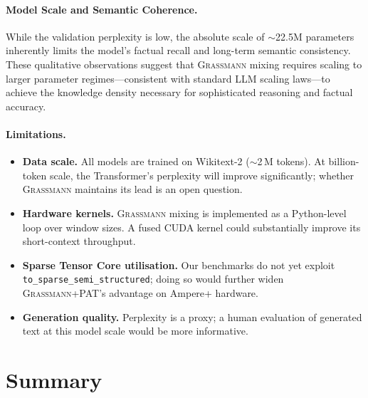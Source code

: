 \documentclass[conference]{IEEEtran}
\newcommand{\grassmann}{\textsc{Grassmann}}
\newcommand{\pat}{\textsc{PAT}}
\begin{document}
\paragraph{Model Scale and Semantic Coherence.}
While the validation perplexity is low, the absolute scale of $\sim$22.5M parameters inherently limits the model's factual recall and long-term semantic consistency. These qualitative observations suggest that \grassmann{} mixing requires scaling to larger parameter regimes—consistent with standard LLM scaling laws—to achieve the knowledge density necessary for sophisticated reasoning and factual accuracy.

\paragraph{Limitations.}
\begin{itemize}[leftmargin=*,topsep=3pt,itemsep=2pt]
  \item \textbf{Data scale.} All models are trained on Wikitext-2
        ($\sim$2\,M tokens). At billion-token scale, the Transformer's
        perplexity will improve significantly; whether \grassmann{}
        maintains its lead is an open question.
  \item \textbf{Hardware kernels.} \grassmann{} mixing is implemented
        as a Python-level loop over window sizes. A fused CUDA kernel
        could substantially improve its short-context throughput.
  \item \textbf{Sparse Tensor Core utilisation.} Our benchmarks do not
        yet exploit \texttt{to\_sparse\_semi\_structured}; doing so
        would further widen \grassmann{}+\pat{}'s advantage on Ampere+
        hardware.
  \item \textbf{Generation quality.} Perplexity is a proxy; a human
        evaluation of generated text at this model scale would be more
        informative.
\end{itemize}



\section{Summary}
\label{sec:summary}
\end{document}
